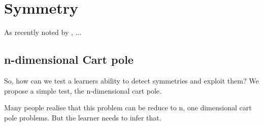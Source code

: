\section{Symmetry}

As recently noted by \cite{Caselles-Dupre2019}, ...


\subsection{n-dimensional Cart pole}

So, how can we test a learners ability to detect symmetries and exploit them?
We propose a simple test, the n-dimensional cart pole.


Many people realise that this problem can be reduce to n, one dimensional cart pole problems.
But the learner needs to infer that.
